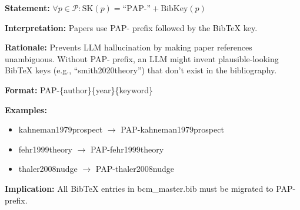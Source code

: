 \begin{tcolorbox}[colback=gray!5!white, colframe=gray!75!black,
    title=Axiom SK-9: Paper Exception]
\textbf{Statement:} $\forall p \in \mathcal{P}: \text{SK}(p) = \text{``PAP-''} + \text{BibKey}(p)$

\textbf{Interpretation:} Papers use PAP- prefix followed by the BibTeX key.

\textbf{Rationale:} Prevents LLM hallucination by making paper references unambiguous.
Without PAP- prefix, an LLM might invent plausible-looking BibTeX keys (e.g.,
``smith2020theory'') that don't exist in the bibliography.

\textbf{Format:} PAP-\{author\}\{year\}\{keyword\}

\textbf{Examples:}
\begin{itemize}[nosep]
\item kahneman1979prospect $\rightarrow$ PAP-kahneman1979prospect
\item fehr1999theory $\rightarrow$ PAP-fehr1999theory
\item thaler2008nudge $\rightarrow$ PAP-thaler2008nudge
\end{itemize}

\textbf{Implication:} All BibTeX entries in bcm\_master.bib must be migrated to PAP- prefix.
\end{tcolorbox}

